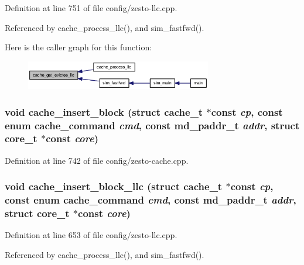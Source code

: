 Definition at line 751 of file config/zesto-llc.cpp.

Referenced by cache\_\-process\_\-llc(), and sim\_\-fastfwd().

Here is the caller graph for this function:\nopagebreak
\begin{figure}[H]
\begin{center}
\leavevmode
\includegraphics[width=230pt]{config_2zesto-cache_8h_77864b4219a45ec15cbe3ff986d131b9_icgraph}
\end{center}
\end{figure}
\subsubsection[{cache\_\-insert\_\-block}]{\setlength{\rightskip}{0pt plus 5cm}void cache\_\-insert\_\-block (struct {\bf cache\_\-t} $\ast$const  {\em cp}, \/  const enum {\bf cache\_\-command} {\em cmd}, \/  const {\bf md\_\-paddr\_\-t} {\em addr}, \/  struct {\bf core\_\-t} $\ast$const  {\em core})}\label{config_2zesto-cache_8h_219ea5df10c94dbf2c820586f981158f}




Definition at line 742 of file config/zesto-cache.cpp.
\subsubsection[{cache\_\-insert\_\-block\_\-llc}]{\setlength{\rightskip}{0pt plus 5cm}void cache\_\-insert\_\-block\_\-llc (struct {\bf cache\_\-t} $\ast$const  {\em cp}, \/  const enum {\bf cache\_\-command} {\em cmd}, \/  const {\bf md\_\-paddr\_\-t} {\em addr}, \/  struct {\bf core\_\-t} $\ast$const  {\em core})}\label{config_2zesto-cache_8h_abc5a15d6fe00d533a2b4b8e4b13cc59}




Definition at line 653 of file config/zesto-llc.cpp.

Referenced by cache\_\-process\_\-llc(), and sim\_\-fastfwd().

